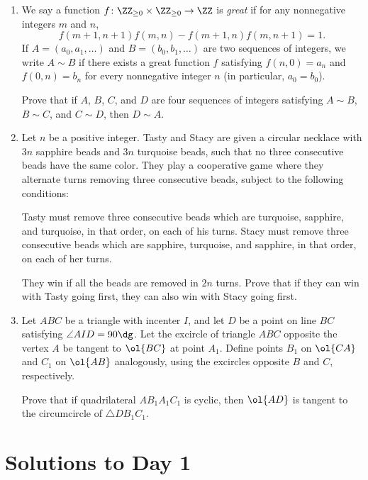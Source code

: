 \documentclass[11pt]{scrartcl}
\begin{document}
\begin{enumerate}[\bfseries 1.]
\item %
We say a function $f \colon \ZZ_{\ge 0} \times \ZZ_{\ge 0} \to \ZZ$
is \emph{great} if for any nonnegative integers $m$ and $n$,
\[ f(m+1, n+1) f(m,n) - f(m+1,n) f(m,n+1) = 1. \]
If $A = (a_0, a_1, \dots)$ and $B = (b_0, b_1, \dots)$
are two sequences of integers,
we write $A \sim B$ if there exists a great function $f$
satisfying $f(n,0) = a_n$ and $f(0,n) = b_n$
for every nonnegative integer $n$ (in particular, $a_0=b_0$).

Prove that if $A$, $B$, $C$, and $D$ are four sequences of integers
satisfying $A \sim B$, $B \sim C$, and $C \sim D$, then $D \sim A$.

\item %
Let $n$ be a positive integer.
Tasty and Stacy are given a circular necklace
with $3n$ sapphire beads and $3n$ turquoise beads,
such that no three consecutive beads have the same color.
They play a cooperative game where they alternate turns
removing three consecutive beads, subject to the following conditions:
\begin{itemize}
   \ii Tasty must remove three consecutive beads
   which are turquoise, sapphire, and turquoise, in that order,
   on each of his turns.
   \ii Stacy must remove three consecutive beads
   which are sapphire, turquoise, and sapphire, in that order,
   on each of her turns.
\end{itemize}
They win if all the beads are removed in $2n$ turns.
Prove that if they can win with Tasty going first,
they can also win with Stacy going first.

\item %
Let $ABC$ be a triangle with incenter $I$,
and let $D$ be a point on line $BC$ satisfying $\angle AID = 90\dg$.
Let the excircle of triangle $ABC$ opposite the vertex $A$
be tangent to $\ol{BC}$ at point $A_1$.
Define points $B_1$ on $\ol{CA}$ and $C_1$ on $\ol{AB}$ analogously,
using the excircles opposite $B$ and $C$, respectively.

Prove that if quadrilateral $AB_1A_1C_1$ is cyclic,
then $\ol{AD}$ is tangent to the circumcircle of $\triangle DB_1C_1$.

\end{enumerate}
\pagebreak

\section{Solutions to Day 1}
\end{document}
